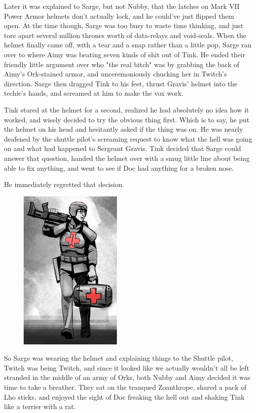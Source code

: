Later it was explained to Sarge, but not Nubby, that the latches on Mark VII Power Armor helmets don't actually lock, and he could've just flipped them open. 
At the time though, Sarge was too busy to waste time thinking, and just tore apart several million thrones worth of data-relays and void-seals. 
When the helmet finally came off, with a tear and a snap rather than a little pop, Sarge ran over to where Aimy was beating seven kinds of shit out of Tink. 
He ended their friendly little argument over who "the real bitch" was by grabbing the back of Aimy's Ork-stained armor, and unceremoniously chucking her in Twitch's direction. 
Sarge then dragged Tink to his feet, thrust Gravis' helmet into the techie's hands, and screamed at him to make the vox work.

Tink stared at the helmet for a second, realized he had absolutely no idea how it worked, and wisely decided to try the obvious thing first. 
Which is to say, he put the helmet on his head and hesitantly asked if the thing was on. 
He was nearly deafened by the shuttle pilot's screaming request to know what the hell was going on and what had happened to Sergeant Gravis. 
Tink decided that Sarge could answer that question, handed the helmet over with a smug little line about being able to fix anything, and went to see if Doc had anything for a broken nose.

He immediately regretted that decision.
\begin{figure}
	\begin{center}
		\includegraphics[width=\figwidth]{pics/12/55.png}
	\end{center}
\end{figure}
So Sarge was wearing the helmet and explaining things to the Shuttle pilot, Twitch was being Twitch, and since it looked like we actually wouldn't all be left stranded in the middle of an army of Orks, both Nubby and Aimy decided it was time to take a breather. 
They sat on the tranqued Zoanthrope, shared a pack of Lho sticks, and enjoyed the sight of Doc freaking the hell out and shaking Tink like a terrier with a rat.

